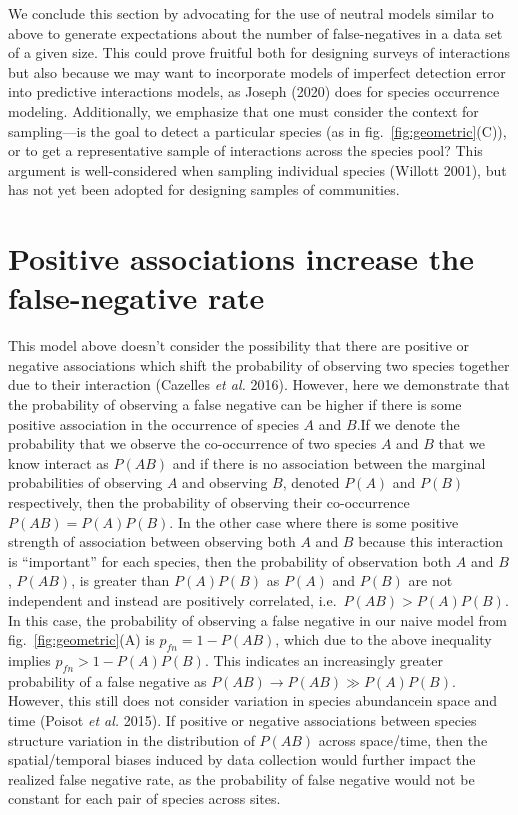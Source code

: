 \documentclass[11pt]{article}
\begin{document}
We conclude this section by advocating for the use of neutral models
similar to above to generate expectations about the number of
false-negatives in a data set of a given size. This could prove fruitful
both for designing surveys of interactions but also because we may want
to incorporate models of imperfect detection error into predictive
interactions models, as Joseph (2020) does for species occurrence
modeling. Additionally, we emphasize that one must consider the context
for sampling---is the goal to detect a particular species (as in
fig.~\ref{fig:geometric}(C)), or to get a representative sample of
interactions across the species pool? This argument is well-considered
when sampling individual species (Willott 2001), but has not yet been
adopted for designing samples of communities.

\hypertarget{positive-associations-increase-the-false-negative-rate}{%
\section{Positive associations increase the false-negative
rate}\label{positive-associations-increase-the-false-negative-rate}}

This model above doesn't consider the possibility that there are
positive or negative associations which shift the probability of
observing two species together due to their interaction (Cazelles
\emph{et al.} 2016). However, here we demonstrate that the probability
of observing a false negative can be higher if there is some positive
association in the occurrence of species \(A\) and \(B\).If we denote
the probability that we observe the co-occurrence of two species \(A\)
and \(B\) that we know interact as \(P(AB)\) and if there is no
association between the marginal probabilities of observing \(A\) and
observing \(B\), denoted \(P(A)\) and \(P(B)\) respectively, then the
probability of observing their co-occurrence \(P(AB) = P(A)P(B)\). In
the other case where there is some positive strength of association
between observing both \(A\) and \(B\) because this interaction is
``important'' for each species, then the probability of observation both
\(A\) and \(B\), \(P(AB)\), is greater than \(P(A)P(B)\) as \(P(A)\) and
\(P(B)\) are not independent and instead are positively correlated,
i.e.~\(P(AB)> P(A)P(B)\). In this case, the probability of observing a
false negative in our naive model from fig.~\ref{fig:geometric}(A) is
\(p_{fn}= 1-P(AB)\), which due to the above inequality implies
\(p_{fn} >1-P(A)P(B)\). This indicates an increasingly greater
probability of a false negative as \(P(AB) \to P(AB) \gg P(A)P(B)\).
However, this still does not consider variation in species abundancein
space and time (Poisot \emph{et al.} 2015). If positive or negative
associations between species structure variation in the distribution of
\(P(AB)\) across space/time, then the spatial/temporal biases induced by
data collection would further impact the realized false negative rate,
as the probability of false negative would not be constant for each pair
of species across sites.
\end{document}
